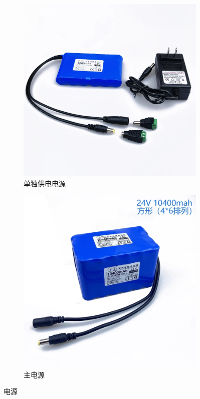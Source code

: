 \documentclass[10pt]{ctexart}
\begin{document}
\begin{figure}[H]
    \centering
    \begin{subfigure}[0]{0.44\textwidth}
        \includegraphics[width = \textwidth]{source/separate_source.jpg}
        \caption{单独供电电源}
        \label{fig:separate_source}
    \end{subfigure}
    \hfil
    \begin{subfigure}[0]{0.44\textwidth}
        \includegraphics[width = \textwidth]{source/main_source.jpg}
        \caption{主电源}
        \label{fig:main_source}
    \end{subfigure}
    \caption{电源}
\end{figure}
\end{document}
